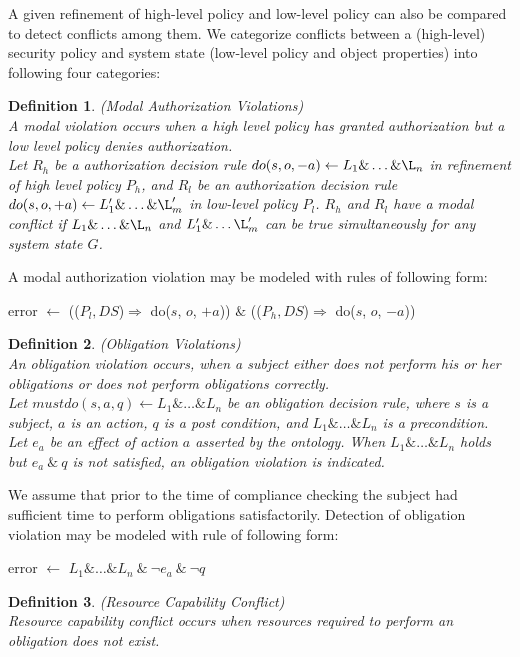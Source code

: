 \documentclass[12pt,journal,letterpaper,onecolumn]{IEEEtran}
\newtheorem{definition}{Definition}[section]
\begin{document}
A given refinement of high-level policy and low-level policy can 
also be compared to detect conflicts among them. 
We categorize conflicts between a (high-level) security policy and
system state (low-level policy and object properties) into following
four categories:

\begin{definition}(Modal Authorization Violations)\\
A modal violation occurs when a high level policy has granted
authorization but a low level policy denies authorization.\\
\noindent Let $ R_h$ be a authorization decision rule $do(s,o,-a)
\leftarrow L_1  \& \ldots \& \L_n$ in refinement of high level
policy $P_h$, and $ R_l$ be an authorization decision rule $do(s, o,
+a) \leftarrow L'_1 \& \ldots \& \L'_m$ in low-level policy $P_l$.
$R_h$ and $R_l$ have a modal conflict if $L_1  \& \ldots \& \L_n$
and $L'_1 \& \ldots \L'_m$ can be true simultaneously for any system
state $G$.
\end{definition}

A modal authorization violation may be modeled with rules of
following form:

 {\ttfamily error $\leftarrow$
(($P_l,DS$)$\Rightarrow$ do($s$, $o$, $+a$)) $\&$
(($P_h,DS$)$\Rightarrow$ do($s$, $o$, $-a$)) }

\begin{definition}(Obligation Violations)\\
An obligation violation occurs, when a subject either does not
perform his or her obligations or does not perform obligations
correctly.\\
 \noindent Let $mustdo(s,a,q) \leftarrow L_1 \& \ldots
\& L_n$ be an obligation decision rule, where $s$ is a subject, $a$
is an action, $q$ is a post condition, and $L_1 \& \ldots \& L_n$ is
a precondition. Let $e_a$ be an effect of action $a$ asserted by the
ontology. When $L_1 \& \ldots \& L_n$ holds but $e_a ~\&~ q$ is not
satisfied, an obligation violation is indicated.
\end{definition}

We assume that prior to the time of compliance checking the subject
had sufficient time to perform obligations satisfactorily. Detection
of obligation violation may be modeled with rule of following form:

{\ttfamily error $\leftarrow$ $L_1 \& \ldots \& L_n ~\&~ \neg e_a
~\&~ \neg q$}

\begin{definition}(Resource Capability Conflict)\\
Resource capability conflict occurs when resources required to
perform an obligation does not exist.
\end{definition}
\end{document}
